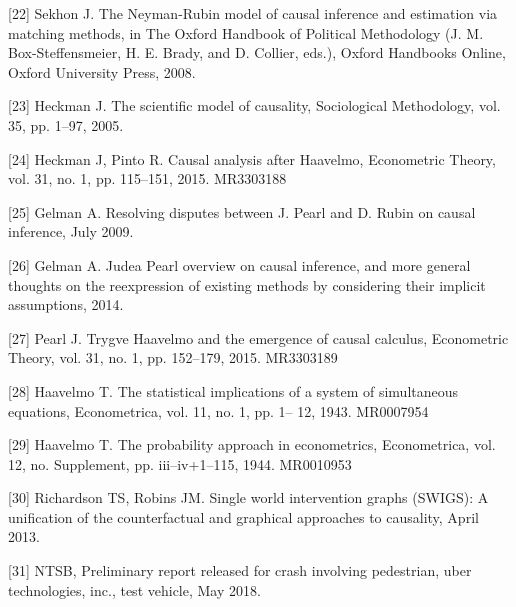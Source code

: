     [22] Sekhon J. The Neyman-Rubin model of causal inference and estimation via matching methods, in The Oxford Handbook of Political Methodology (J. M. Box-Steffensmeier, H. E. Brady, and D. Collier, eds.), Oxford Handbooks Online, Oxford University Press, 2008.
    
    [23] Heckman J. The scientific model of causality, Sociological Methodology, vol. 35, pp. 1–97, 2005.
    
    [24] Heckman J, Pinto R. Causal analysis after Haavelmo, Econometric Theory, vol. 31, no. 1, pp. 115–151, 2015. MR3303188
    
    [25] Gelman A. Resolving disputes between J. Pearl and D. Rubin on causal inference, July 2009.
    
    [26] Gelman A. Judea Pearl overview on causal inference, and more general thoughts on the reexpression of existing methods by considering their implicit assumptions, 2014.
    
    [27] Pearl J. Trygve Haavelmo and the emergence of causal calculus, Econometric Theory, vol. 31, no. 1, pp. 152–179, 2015. MR3303189
    
    [28] Haavelmo T. The statistical implications of a system of simultaneous equations, Econometrica, vol. 11, no. 1, pp. 1– 12, 1943. MR0007954
    
    [29] Haavelmo T. The probability approach in econometrics, Econometrica, vol. 12, no. Supplement, pp. iii–iv+1–115, 1944. MR0010953
    
    [30] Richardson TS, Robins JM. Single world intervention graphs (SWIGS): A unification of the counterfactual and graphical approaches to causality, April 2013.
    
    [31] NTSB, Preliminary report released for crash involving pedestrian, uber technologies, inc., test vehicle, May 2018.


